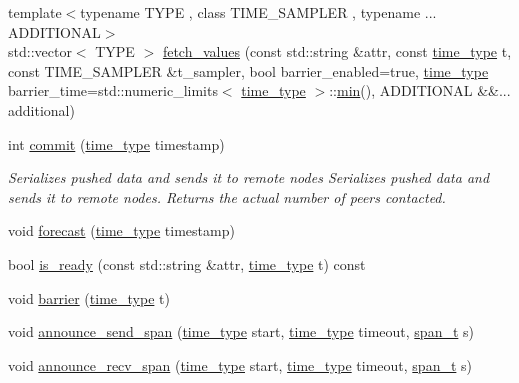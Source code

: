 \begin{DoxyCompactItemize}
{\footnotesize template$<$typename T\+Y\+PE , class T\+I\+M\+E\+\_\+\+S\+A\+M\+P\+L\+ER , typename ... A\+D\+D\+I\+T\+I\+O\+N\+AL$>$ }\\std\+::vector$<$ T\+Y\+PE $>$ \hyperlink{classmui_1_1uniface_a23f0fc2d6720842eb274afd47021c09a}{fetch\+\_\+values} (const std\+::string \&attr, const \hyperlink{classmui_1_1uniface_a65cbecf1936d7d61cb45f14b1138dc07}{time\+\_\+type} t, const T\+I\+M\+E\+\_\+\+S\+A\+M\+P\+L\+ER \&t\+\_\+sampler, bool barrier\+\_\+enabled=true, \hyperlink{classmui_1_1uniface_a65cbecf1936d7d61cb45f14b1138dc07}{time\+\_\+type} barrier\+\_\+time=std\+::numeric\+\_\+limits$<$ \hyperlink{classmui_1_1uniface_a65cbecf1936d7d61cb45f14b1138dc07}{time\+\_\+type} $>$\+::\hyperlink{namespacemui_afabb57f76b23f5a3542a0510943e69e0}{min}(), A\+D\+D\+I\+T\+I\+O\+N\+AL \&\&... additional)
\item 
int \hyperlink{classmui_1_1uniface_ac6f846bd374007f583ccce646cb0a96f}{commit} (\hyperlink{classmui_1_1uniface_a65cbecf1936d7d61cb45f14b1138dc07}{time\+\_\+type} timestamp)
\begin{DoxyCompactList}\small\item\em Serializes pushed data and sends it to remote nodes Serializes pushed data and sends it to remote nodes. Returns the actual number of peers contacted. \end{DoxyCompactList}\item 
void \hyperlink{classmui_1_1uniface_a24cd0f0b799176426481102a53ef25d5}{forecast} (\hyperlink{classmui_1_1uniface_a65cbecf1936d7d61cb45f14b1138dc07}{time\+\_\+type} timestamp)
\item 
bool \hyperlink{classmui_1_1uniface_a5c3b0f69a64e78c505500d26cb222a57}{is\+\_\+ready} (const std\+::string \&attr, \hyperlink{classmui_1_1uniface_a65cbecf1936d7d61cb45f14b1138dc07}{time\+\_\+type} t) const
\item 
void \hyperlink{classmui_1_1uniface_ab9543cf4c7a9d138cce36d711340b7f9}{barrier} (\hyperlink{classmui_1_1uniface_a65cbecf1936d7d61cb45f14b1138dc07}{time\+\_\+type} t)
\item 
void \hyperlink{classmui_1_1uniface_a342edf8b81f133d1dc5cc7bb6bb76e52}{announce\+\_\+send\+\_\+span} (\hyperlink{classmui_1_1uniface_a65cbecf1936d7d61cb45f14b1138dc07}{time\+\_\+type} start, \hyperlink{classmui_1_1uniface_a65cbecf1936d7d61cb45f14b1138dc07}{time\+\_\+type} timeout, \hyperlink{classmui_1_1uniface_a9aeea388b73b17bdc634eb1c96cbfeff}{span\+\_\+t} s)
\item 
void \hyperlink{classmui_1_1uniface_a5d1c452decc0aeab99aa071a82e81def}{announce\+\_\+recv\+\_\+span} (\hyperlink{classmui_1_1uniface_a65cbecf1936d7d61cb45f14b1138dc07}{time\+\_\+type} start, \hyperlink{classmui_1_1uniface_a65cbecf1936d7d61cb45f14b1138dc07}{time\+\_\+type} timeout, \hyperlink{classmui_1_1uniface_a9aeea388b73b17bdc634eb1c96cbfeff}{span\+\_\+t} s)

\end{DoxyCompactItemize}
